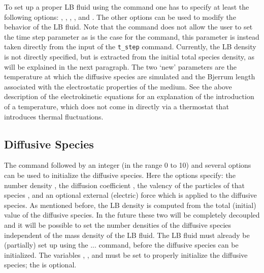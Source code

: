 To set up a proper LB fluid using the  command one has to
specify at least the following options: , , ,
, and . The other options can be used to modify the
behavior of the LB fluid. Note that the  command does not 
allow the user to set the time step parameter  as is the case for the
 command, this parameter is instead taken directly from the input
of the  \texttt{t\_step} command. Currently, the LB density is not
directly specified, but is extracted from the initial total species density, as
will be explained in the next paragraph. The two `new' parameters are  
the temperature at which the diffusive species are simulated and 
 the Bjerrum length associated with the electrostatic 
properties of the medium. See the above description of the electrokinetic 
equations for an explanation of the introduction of a temperature, which does 
not come in directly via a thermostat that introduces thermal fluctuations.

\subsection{\label{ssec:ek-diff-species}Diffusive Species}

\begin{essyntax}
  \begin{features}
  \end{features}
\end{essyntax}
The  command followed by an integer 
(in the range 0 to 10) and several options can be used to initialize the 
diffusive species. Here the options specify: the number density
, the diffusion coefficient , the valency of the particles 
of that species , and an optional external (electric) force which
is applied to the diffusive species. As mentioned before, the LB density is 
computed from the total (initial) value of the diffusive species. In the future
these two will be completely decoupled and it will be possible to set the number
densities of the diffusive species independent of the mass density of the LB
fluid. The LB fluid must already be (partially) set up using the 
  ... command, before the diffusive species can
be initialized. The variables , , and  must be 
set to properly initialize the diffusive species; the  is
optional.

